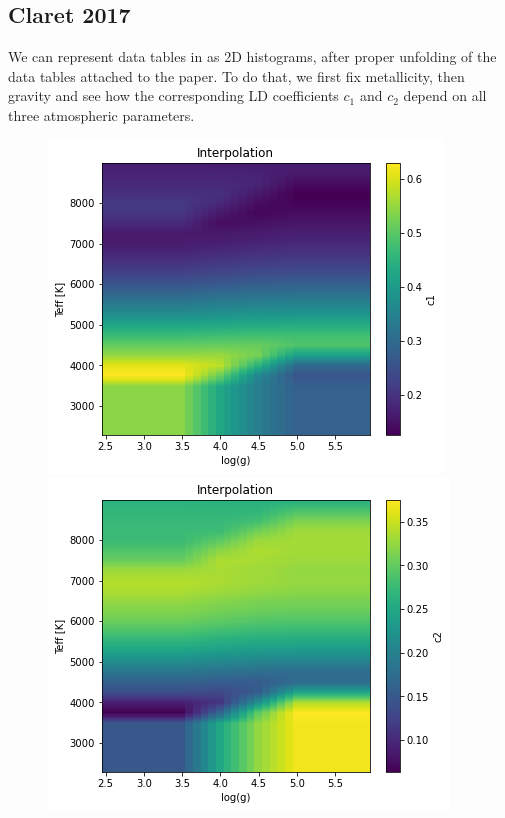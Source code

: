 \documentclass[a4paper,11pt,twocolumn]{article}
\begin{document}
\subsection{Claret 2017}
We can represent data tables in \cite{claret2017} as 2D histograms, 
after proper unfolding of the data tables attached to the paper. To do that, 
we first fix metallicity, then gravity and see how the corresponding LD 
coefficients $c_1$ and $c_2$ depend on all three atmospheric parameters. 
\begin{figure}[H]
    \centering  
    \includegraphics[scale=0.5, angle=0]{../pictures/Claret2017/2017_c1_fixedmet}
    \includegraphics[scale=0.5, angle=0]{../pictures/Claret2017/2017_c2_fixedmet}


\end{figure}
\end{document}
